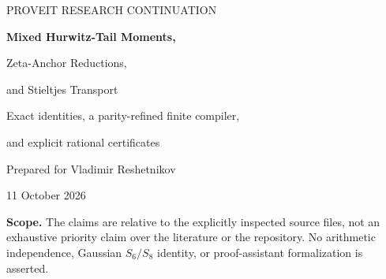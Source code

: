 \documentclass[11pt,letterpaper]{article}
\numberwithin{equation}{section}
\theoremstyle{definition}\newtheorem{definition}[theorem]{Definition}
\theoremstyle{remark}\newtheorem{remark}[theorem]{Remark}
\begin{document}
\begin{titlepage}
\vspace*{10mm}
{\sffamily\large PROVEIT RESEARCH CONTINUATION\par}
\vspace{12mm}
{\LARGE\bfseries Mixed Hurwitz-Tail Moments,\par
Zeta-Anchor Reductions,\par
and Stieltjes Transport\par}
\vspace{8mm}
{\large Exact identities, a parity-refined finite compiler,\par
and explicit rational certificates\par}
\vspace{12mm}
{Prepared for Vladimir Reshetnikov\par}
\smallskip
{11 October 2026\par}
\vspace{10mm}
\begin{abstract}
We continue the harmonic-tail and Gamma--Stieltjes branches of the ProveIt
polylogarithm programme. Three explicitly defined anchors in the existing
fifth- and sixth-power moment generators are reduced to ordinary zeta
products and, at weight eight, a single specified depth-two value.
The reductions are proved by finite rational combinations of classical
double-shuffle relations; complete short certificates are printed and
independently replayed.

For an arbitrary product of integer-order Hurwitz tails, including odd
and unequal orders, we give a terminating formula for every regular
centered moment. The answer lies in the rational span of admissible
multiple zeta values of weight at most $W-1$, where $W$ is the sum of
the tail orders. For odd centered degree the ceiling improves to $W-2$.
A separate, simpler formula treats the full $(2,3)$ family and gives
an ordinary polynomially subtracted series with value exactly $-15$;
we supply a direct finite telescoper for it.

Finally, weighting by successive differences of a tail product gives
all-index generalized-Stieltjes sums, polygamma identities, anchored
Gamma-ratio sums, and primitives in terms of Hurwitz order derivatives
at zero. A finite multiple-polylogarithm kernel identifies their
coefficients with convergent final-index multiple-zeta derivatives.
The article distinguishes these continuations from the already proved
all-power even-tail recurrences. It includes source-status notes,
an independently replayable exact certificate suite, numerical
diagnostics, and a precise further-research agenda.
\end{abstract}
\vfill
\noindent\small\textbf{Scope.} The claims are relative to the explicitly
inspected source files, not an exhaustive priority claim over the
literature or the repository. No arithmetic independence, Gaussian
$S_6/S_8$ identity, or proof-assistant formalization is asserted.
\end{titlepage}
\tableofcontents
\clearpage
\end{document}
